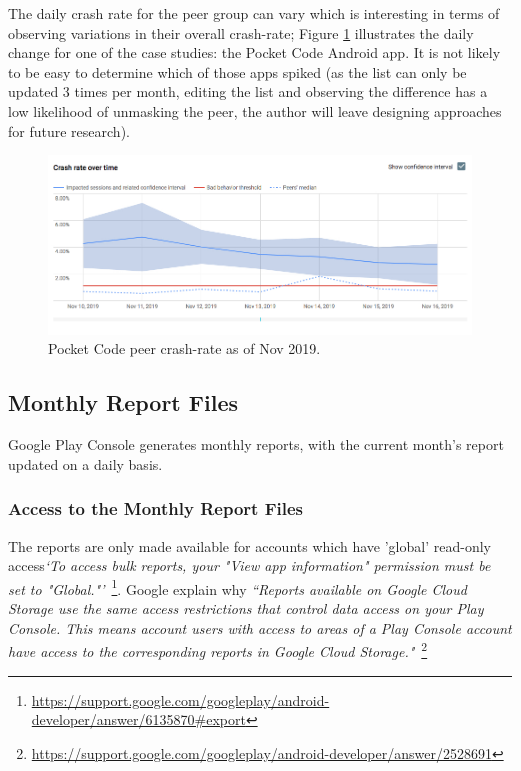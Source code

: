 The daily crash rate for the peer group can vary which is interesting in terms of observing variations in their overall crash-rate; Figure \ref{fig:pocketcode_peer_crash_rate_18_nov_2019} illustrates the daily change for one of the case studies: the Pocket Code Android app. It is not likely to be easy to determine which of those apps spiked (as the list can only be updated 3 times per month, editing the list and observing the difference has a low likelihood of unmasking the peer, the author will leave designing approaches for future research).

\begin{figure}[htbp!]
    \centering
    \includegraphics[width=\textwidth]{images/android-vitals-screenshots/peer-crash-rate-catrobat-18-nov-2019.jpg}
    \caption{Pocket Code peer crash-rate as of  Nov 2019.}
    \label{fig:pocketcode_peer_crash_rate_18_nov_2019}
\end{figure}{}


\subsection{Monthly Report Files}

Google Play Console generates monthly reports, with the current month's report updated on a daily basis. 


\subsubsection{Access to the Monthly Report Files}
The reports are only made available for accounts which have 'global' read-only access\emph{`To access bulk reports, your "View app information" permission must be set to "Global."'}~\footnote{\url{https://support.google.com/googleplay/android-developer/answer/6135870\#export}}. Google explain why \emph{``Reports available on Google Cloud Storage use the same access restrictions that control data access on your Play Console. This means account users with access to areas of a Play Console account have access to the corresponding reports in Google Cloud Storage."}~\footnote{\url{https://support.google.com/googleplay/android-developer/answer/2528691}}  

